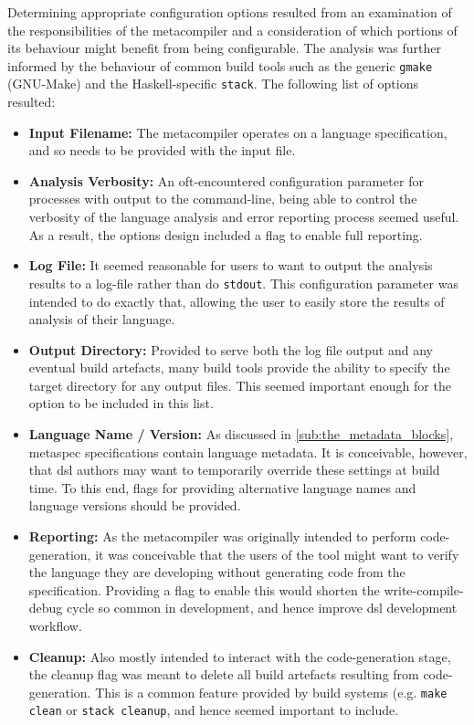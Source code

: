 Determining appropriate configuration options resulted from an examination of the responsibilities of the metacompiler and a consideration of which portions of its behaviour might benefit from being configurable.
The analysis was further informed by the behaviour of common build tools such as the generic \texttt{gmake} (GNU-Make) and the Haskell-specific \texttt{stack}.
The following list of options resulted:
\begin{itemize}
    \item \textbf{Input Filename:} The metacompiler operates on a language specification, and so needs to be provided with the input file.
    \item \textbf{Analysis Verbosity:} An oft-encountered configuration parameter for processes with output to the command-line, being able to control the verbosity of the language analysis and error reporting process seemed useful.
    As a result, the options design included a flag to enable full reporting.
    \item \textbf{Log File:} It seemed reasonable for users to want to output the analysis results to a log-file rather than do \texttt{stdout}.
    This configuration parameter was intended to do exactly that, allowing the user to easily store the results of analysis of their language.
    \item \textbf{Output Directory:} Provided to serve both the log file output and any eventual build artefacts, many build tools provide the ability to specify the target directory for any output files.
    This seemed important enough for the option to be included in this list. 
    \item \textbf{Language Name / Version:} As discussed in \autoref{sub:the_metadata_blocks}, \gls{metaspec} specifications contain language metadata. 
    It is conceivable, however, that \gls{dsl} authors may want to temporarily override these settings at build time.
    To this end, flags for providing alternative language names and language versions should be provided. 
    \item \textbf{Reporting:} As the metacompiler was originally intended to perform code-generation, it was conceivable that the users of the tool might want to verify the language they are developing without generating code from the specification. 
    Providing a flag to enable this would shorten the write-compile-debug cycle so common in development, and hence improve \gls{dsl} development workflow.
    \item \textbf{Cleanup:} Also mostly intended to interact with the code-generation stage, the cleanup flag was meant to delete all build artefacts resulting from code-generation.
    This is a common feature provided by build systems (e.g. \texttt{make clean} or \texttt{stack cleanup}, and hence seemed important to include.
\end{itemize}


